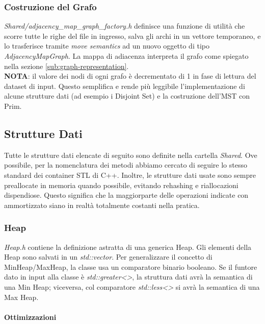 \subsubsection {Costruzione del Grafo}

\textit{Shared/adjacency\_map\_graph\_factory.h} definisce una funzione di utilità che scorre tutte le righe del file in ingresso, salva gli archi in un vettore temporaneo, e lo trasferisce tramite \textit{move semantics} ad un nuovo oggetto di tipo \textit{AdjacencyMapGraph}. La mappa di adiacenza interpreta il grafo come spiegato nella sezione \ref{sub:graph-representation}. \\

\noindent \textbf{NOTA}: il valore dei nodi di ogni grafo è decrementato di 1 in fase di lettura del dataset di input.
Questo semplifica e rende più leggibile l'implementazione di alcune strutture dati (ad esempio i Disjoint Set) e la costruzione dell'MST con Prim.

\subsection{Strutture Dati}

Tutte le strutture dati elencate di seguito sono definite nella cartella \textit{Shared}.
Ove possibile, per la nomenclatura dei metodi abbiamo cercato di seguire lo stesso standard dei container STL di C++.
Inoltre, le strutture dati usate sono sempre preallocate in memoria quando possibile, evitando rehashing e riallocazioni dispendiose. Questo significa che la maggiorparte delle operazioni indicate con \complexityConstant{} ammortizzato siano in realtà totalmente costanti nella pratica.

\subsubsection{Heap}

\textit{Heap.h} contiene la definizione astratta di una generica Heap.
Gli elementi della Heap sono salvati in un \textit{std::vector}.
Per generalizzare il concetto di MinHeap/MaxHeap, la classe usa un comparatore binario booleano. Se il funtore dato in input alla classe è
\textit{std::greater<>}, la struttura dati avrà la semantica di una Min Heap; viceversa, col comparatore \textit{std::less<>} si avrà la semantica di una Max Heap.

\paragraph{Ottimizzazioni}\mbox{} \\

